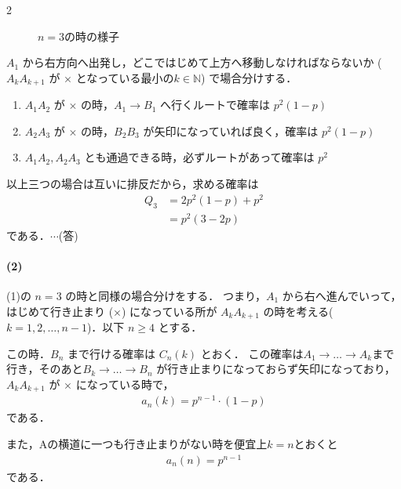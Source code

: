 \documentclass[../../main.tex]{subfiles}
\begin{document}
\begin{multicols}{2}
\begin{figure}[H]
    \caption{$n=3$の時の様子}
    \label{1998-5:fig:3}
  \end{figure}

  $A_1$ から右方向へ出発し，どこではじめて上方へ移動しなければならないか
  ($A_k A_{k+1}$ が $\times$ となっている最小の$k \in \mathbb{N}$) で場合分けする．
  \begin{enumerate}
    \item $A_1 A_2$ が $\times$ の時，$A_1 \to B_1$ へ行くルートで確率は $p^2 (1-p)$
    \item $A_2 A_3$ が $\times$ の時，$B_2 B_3$ が矢印になっていれば良く，確率は $p^2 (1-p)$
    \item $A_1 A_2, A_2 A_3$ とも通過できる時，必ずルートがあって確率は $p^2$
  \end{enumerate}
  以上三つの場合は互いに排反だから，求める確率は
  \begin{align}
    Q_3
    & = 2p^2 (1-p) + p^2 \\
    & = p^2 (3-2p)
  \end{align}
  である．$\cdots$(答)

  \paragraph{(2)}

  (1)の $n=3$ の時と同様の場合分けをする．
  つまり，$A_1$ から右へ進んでいって，はじめて行き止まり ($\times$) になっている所が
  $A_k A_{k+1}$ の時を考える($k=1, 2, \dots, n-1$)．以下 $n \ge 4$ とする．

  この時．$B_n$ まで行ける確率は $C_n(k)$ とおく．
  この確率は$A_1 \to \dots \to A_k$まで行き，そのあと$B_k \to \dots \to B_n$
  が行き止まりになっておらず矢印になっており，$A_k A_{k+1}$ が $\times$ になっている時で，
  \begin{align}
    a_n(k) = p^{n-1} \cdot (1-p)
  \end{align}
  である．

  また，Aの横道に一つも行き止まりがない時を便宜上$k=n$とおくと
  \begin{align}
    a_n(n) = p^{n-1}
  \end{align}
  である．


\end{multicols}
\end{document}
